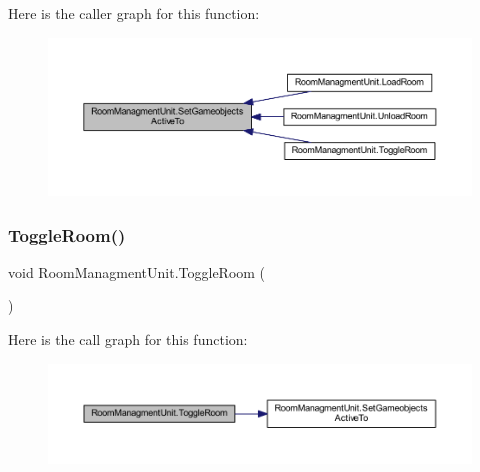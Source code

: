 Here is the caller graph for this function\+:
\nopagebreak
\begin{figure}[H]
\begin{center}
\leavevmode
\includegraphics[width=350pt]{class_room_managment_unit_ae39467cac522f23c198693c215968ad7_icgraph}
\end{center}
\end{figure}
\mbox{\label{class_room_managment_unit_a6043074719f8d67150cbfcff4c7a4cec}} 
\subsubsection{\texorpdfstring{Toggle\+Room()}{ToggleRoom()}}
{\footnotesize\ttfamily void Room\+Managment\+Unit.\+Toggle\+Room (\begin{DoxyParamCaption}{ }\end{DoxyParamCaption})}

Here is the call graph for this function\+:
\nopagebreak
\begin{figure}[H]
\begin{center}
\leavevmode
\includegraphics[width=350pt]{class_room_managment_unit_a6043074719f8d67150cbfcff4c7a4cec_cgraph}
\end{center}
\end{figure}
\mbox{\label{class_room_managment_unit_af1299b6fbb2496cc4cb0e14a95cc2b9c}} 
